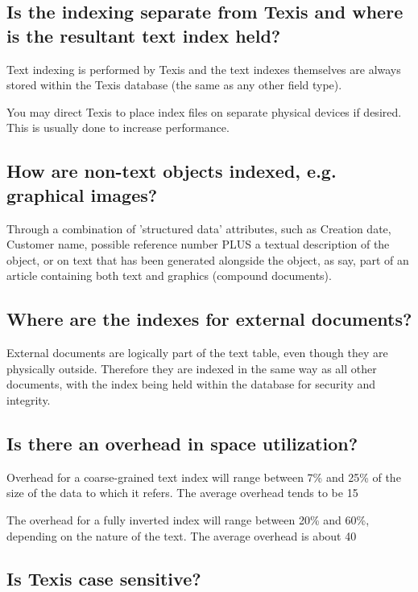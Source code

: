 \subsection{Is the indexing separate from Texis and where is the resultant text index
held?}

Text indexing is performed by Texis and the text indexes themselves
are always stored within the Texis database (the same as any other field
type).

You may direct Texis to place index files on separate physical devices
if desired. This is usually done to increase performance.

\subsection{How are non-text objects indexed, e.g. graphical images?}

Through a combination of 'structured data' attributes, such as Creation
date, Customer name, possible reference number PLUS a textual description
of the object, or on text that has been generated alongside the object, as
say, part of an article containing both text and graphics (compound
documents).

\subsection{Where are the indexes for external documents?}

External documents are logically part of the text table, even though they
are physically outside.  Therefore they are indexed in the same way as all
other documents, with the index being held within the database for
security and integrity.

\subsection{Is there an overhead in space utilization?}

Overhead for a coarse-grained text index will range between 7\% and 25\% of
the size of the data to which it refers.  The average overhead tends to
be 15%

The overhead for a fully inverted index will range between 20\% and 60\%,
depending on the nature of the text.
The average overhead is about 40%

\subsection{Is Texis case sensitive?}

